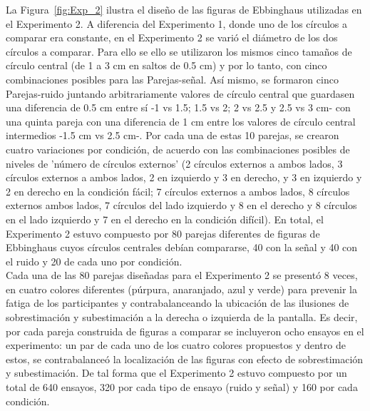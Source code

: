 \begin{itemize}
La Figura~\ref{fig:Exp_2} ilustra el diseño de las figuras de Ebbinghaus utilizadas en el Experimento 2. A diferencia del Experimento 1, donde uno de los círculos a comparar era constante, en el Experimento 2 se varió el diámetro de los dos círculos a comparar. Para ello se ello se utilizaron los mismos cinco tamaños de círculo central (de 1 a 3 cm en saltos de 0.5 cm) y por lo tanto, con cinco combinaciones posibles para las Parejas-señal. Así mismo, se formaron cinco Parejas-ruido juntando arbitrariamente valores de círculo central que guardasen una diferencia de 0.5 cm entre sí -1 vs 1.5; 1.5 vs 2; 2 vs 2.5 y 2.5 vs 3 cm- con una quinta pareja con una diferencia de 1 cm entre los valores de círculo central intermedios -1.5 cm vs 2.5 cm-. Por cada una de estas 10 parejas, se crearon cuatro variaciones por condición, de acuerdo con las combinaciones posibles de niveles de 'número de círculos externos' (2 círculos externos a ambos lados, 3 círculos externos a ambos lados, 2 en izquierdo y 3 en derecho, y 3 en izquierdo y 2 en derecho en la condición fácil; 7 círculos externos a ambos lados, 8 círculos externos ambos lados, 7 círculos del lado izquierdo y 8 en el derecho y 8 círculos en el lado izquierdo y 7 en el derecho en la condición difícil). En total, el Experimento 2 estuvo compuesto por 80 parejas diferentes de figuras de Ebbinghaus cuyos círculos centrales debían compararse, 40 con la señal y 40 con el ruido y 20 de cada uno por condición.\\

Cada una de las 80 parejas diseñadas para el Experimento 2 se presentó 8 veces, en cuatro colores diferentes (púrpura, anaranjado, azul y verde) para prevenir la fatiga de los participantes y contrabalanceando la ubicación de las ilusiones de sobrestimación y subestimación a la derecha o izquierda de la pantalla. Es decir, por cada pareja construida de figuras a comparar se incluyeron ocho ensayos en el experimento: un par de cada uno de los cuatro colores propuestos y dentro de estos, se contrabalanceó la localización de las figuras con efecto de sobrestimación y subestimación. De tal forma que el Experimento 2 estuvo compuesto por un total de 640 ensayos, 320 por cada tipo de ensayo (ruido y señal) y 160 por cada condición.\\ 


\end{itemize}
